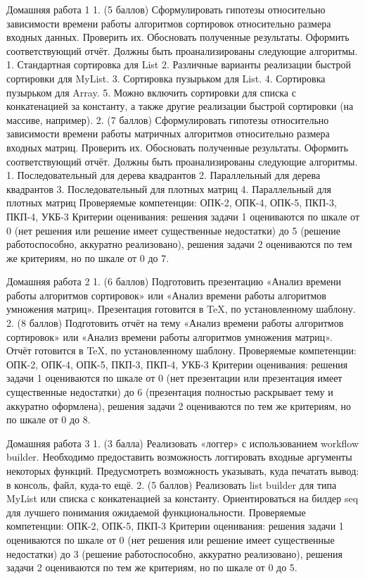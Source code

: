 Домашняя работа 1
    1. (5 баллов) Сформулировать гипотезы относительно зависимости времени работы алгоритмов  сортировок относительно размера входных данных. Проверить их. Обосновать полученные результаты. Оформить соответствующий отчёт. Должны быть проанализированы следующие алгоритмы.
        1. Стандартная сортировка для List
        2. Различные варианты реализации быстрой сортировки для MyList.
        3. Сортировка пузырьком для List.
        4. Сортировка пузырьком для Array.
        5. Можно включить сортировки для списка с конкатенацией за константу, а также другие реализации быстрой сортировки (на массиве, например).
    2. (7 баллов) Сформулировать гипотезы относительно зависимости времени работы матричных алгоритмов относительно размера входных матриц. Проверить их. Обосновать полученные результаты. Оформить соответствующий отчёт. Должны быть проанализированы следующие алгоритмы.
        1. Последовательный для дерева квадрантов
        2. Параллельный для дерева квадрантов
        3. Последовательный для плотных матриц
        4. Параллельный для плотных матриц
Проверяемые компетенции: ОПК-2, ОПК-4, ОПК-5, ПКП-3, ПКП-4, УКБ-3
Критерии оценивания: решения задачи 1 оцениваются по шкале от 0 (нет решения или решение имеет существенные недостатки) до 5 (решение работоспособно, аккуратно реализовано), решения задачи 2 оцениваются по тем же критериям, но по шкале от 0 до 7.

Домашняя работа 2
    1. (6 баллов) Подготовить презентацию «Анализ времени работы алгоритмов сортировок» или «Анализ времени работы алгоритмов умножения матриц». Презентация готовится в TeX, по установленному шаблону.
    2. (8 баллов) Подготовить отчёт на тему «Анализ времени работы алгоритмов сортировок» или «Анализ времени работы алгоритмов умножения матриц». Отчёт готовится в TeX, по установленному шаблону.
Проверяемые компетенции: ОПК-2, ОПК-4, ОПК-5, ПКП-3, ПКП-4, УКБ-3
Критерии оценивания: решения задачи 1 оцениваются по шкале от 0 (нет презентации или презентация имеет существенные недостатки) до 6 (презентация полностью раскрывает тему и аккуратно оформлена), решения задачи 2 оцениваются по тем же критериям, но по шкале от 0 до 8.

Домашняя работа 3
    1. (3 балла) Реализовать «логгер» с использованием workflow builder. Необходимо предоставить возможность логгировать входные аргументы некоторых функций. Предусмотреть возможность указывать, куда печатать вывод: в консоль, файл, куда-то ещё.
    2. (5 баллов) Реализовать list builder для типа MyList или списка с конкатенацией за константу. Ориентироваться на билдер seq для лучшего понимания ожидаемой функциональности.
Проверяемые компетенции: ОПК-2, ОПК-5, ПКП-3
Критерии оценивания: решения задачи 1 оцениваются по шкале от 0 (нет решения или решение имеет существенные недостатки) до 3 (решение работоспособно, аккуратно реализовано), решения задачи 2 оцениваются по тем же критериям, но по шкале от 0 до 5.

